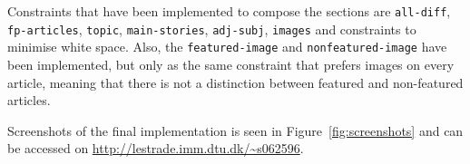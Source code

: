 %

Constraints that have been implemented to compose the sections are \texttt{all-diff}, \texttt{fp-articles}, \texttt{topic}, \texttt{main-stories}, \texttt{adj-subj}, \texttt{images} and constraints to minimise white space. Also, the \texttt{featured-image} and \texttt{nonfeatured-image} have been implemented, but only as the same constraint that prefers images on every article, meaning that there is not a distinction between featured and non-featured articles.

Screenshots of the final implementation is seen in Figure~\ref{fig:screenshots} and can be accessed on \url{http://lestrade.imm.dtu.dk/~s062596}.


